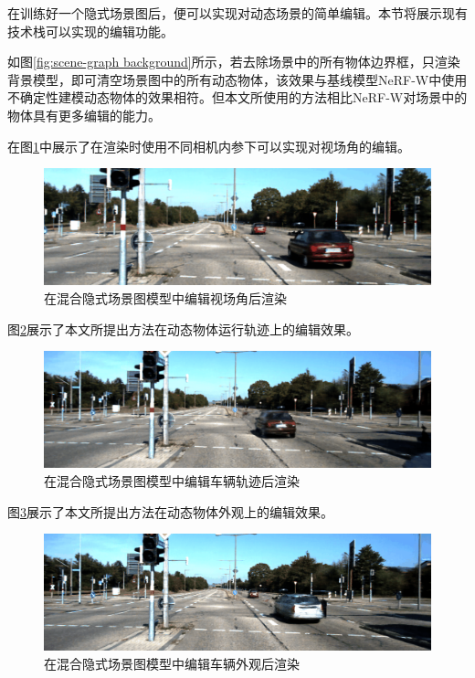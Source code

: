 在训练好一个隐式场景图后，便可以实现对动态场景的简单编辑。本节将展示现有技术栈可以实现的编辑功能。

如图\ref{fig:scene-graph background}所示，若去除场景中的所有物体边界框，只渲染背景模型，即可清空场景图中的所有动态物体，该效果与基线模型NeRF-W\cite{martin-brualla_nerf_2021}中使用不确定性建模动态物体的效果相符。但本文所使用的方法相比NeRF-W对场景中的物体具有更多编辑的能力。

在图\ref{fig:scene-graph fov editing}中展示了在渲染时使用不同相机内参下可以实现对视场角的编辑。

\begin{figure}[ht]
    \centering
    \includegraphics[width=\textwidth]{undergraduate-thesis/images/experiments/scene-graph edit fov.png}
    \caption{在混合隐式场景图模型中编辑视场角后渲染}
    \label{fig:scene-graph fov editing}
\end{figure}

图\ref{fig:scene-graph traj editing}展示了本文所提出方法在动态物体运行轨迹上的编辑效果。

\begin{figure}[ht]
    \centering
    \includegraphics[width=\textwidth]{undergraduate-thesis/images/experiments/scene-graph edit trajectory.png}
    \caption{在混合隐式场景图模型中编辑车辆轨迹后渲染}
    \label{fig:scene-graph traj editing}
\end{figure}

图\ref{fig:scene-graph appearance editing}展示了本文所提出方法在动态物体外观上的编辑效果。

\begin{figure}[ht]
    \centering
    \includegraphics[width=\textwidth]{undergraduate-thesis/images/experiments/scene-graph appearance editing.png}
    \caption{在混合隐式场景图模型中编辑车辆外观后渲染}
    \label{fig:scene-graph appearance editing}
\end{figure}

